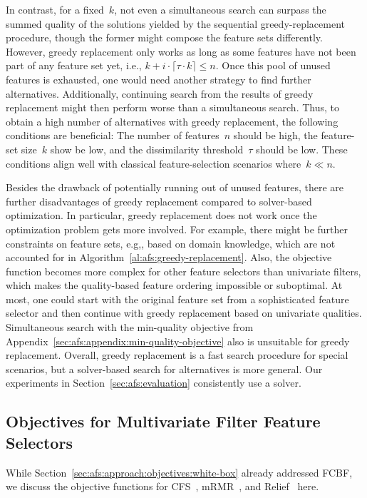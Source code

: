 \documentclass{article}
\theoremstyle{definition}
\begin{document}
In contrast, for a fixed~$k$, not even a simultaneous search can surpass the summed quality of the solutions yielded by the sequential greedy-replacement procedure, though the former might compose the feature sets differently.
However, greedy replacement only works as long as some features have not been part of any feature set yet, i.e., $k + i \cdot \lceil \tau \cdot k \rceil \leq n$.
Once this pool of unused features is exhausted, one would need another strategy to find further alternatives.
Additionally, continuing search from the results of greedy replacement might then perform worse than a simultaneous search.
Thus, to obtain a high number of alternatives with greedy replacement, the following conditions are beneficial:
The number of features~$n$ should be high, the feature-set size~$k$ show be low, and the dissimilarity threshold~$\tau$ should be low.
These conditions align well with classical feature-selection scenarios where~$k \ll n$.

Besides the drawback of potentially running out of unused features, there are further disadvantages of greedy replacement compared to solver-based optimization.
In particular, greedy replacement does not work once the optimization problem gets more involved.
For example, there might be further constraints on feature sets, e.g,, based on domain knowledge, which are not accounted for in Algorithm~\ref{al:afs:greedy-replacement}.
Also, the objective function becomes more complex for other feature selectors than univariate filters, which makes the quality-based feature ordering impossible or suboptimal.
At most, one could start with the original feature set from a sophisticated feature selector and then continue with greedy replacement based on univariate qualities.
Simultaneous search with the min-quality objective from Appendix~\ref{sec:afs:appendix:min-quality-objective} also is unsuitable for greedy replacement.
Overall, greedy replacement is a fast search procedure for special scenarios, but a solver-based search for alternatives is more general.
Our experiments in Section~\ref{sec:afs:evaluation} consistently use a solver.

\subsection{Objectives for Multivariate Filter Feature Selectors}
\label{sec:afs:appendix:multivariate-filter-objectives}

While Section~\ref{sec:afs:approach:objectives:white-box} already addressed FCBF, we discuss the objective functions for CFS~\cite{hall1999correlation, hall2000correlation}, mRMR~\cite{peng2005feature}, and Relief~\cite{kira1992feature, robnik1997adaptation} here.
\end{document}
